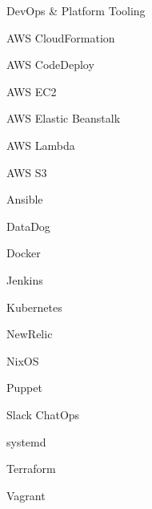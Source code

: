 \begin{skillset}{DevOps \& Platform Tooling}
  \item AWS CloudFormation
  \item AWS CodeDeploy
  \item AWS EC2
  \item AWS Elastic Beanstalk
  \item AWS Lambda
  \item AWS S3
  \item Ansible
  \item DataDog
  \item Docker
  \item Jenkins
  \item Kubernetes
  \item NewRelic
  \item NixOS
  \item Puppet
  \item Slack ChatOps
  \item systemd
  \item Terraform
  \item Vagrant
\end{skillset}
